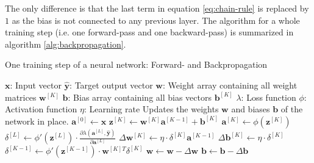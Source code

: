 The only difference is that the last term in equation \ref{eq:chain-rule} is replaced by $1$ as the bias is not connected to any previous layer.
The algorithm for a whole training step (i.e. one forward-pass and one backward-pass) is summarized in algorithm \ref{alg:backpropagation}.
\begin{algorithm}
    \caption{One training step of a neural network: Forward- and Backpropagation}
    \label{alg:backpropagation}
    \begin{algorithmic}[1]
        \renewcommand{\algorithmicensure}{\textbf{Output:}}
        \Require
            \Statex $\bm{x}$: Input vector
            \Statex $\bm{\hat{y}}$: Target output vector
            \Statex $\bm{w}$: Weight array containing all weight matrices $\bm{w}^{[K]}$
            \Statex $\bm{b}$: Bias array containing all bias vectors $\bm{b}^{[K]}$
            \Statex $\lambda$: Loss function
            \Statex $\phi$: Activation function
            \Statex $\eta$: Learning rate
        \Ensure Updates the weights $\bm{w}$ and biases $\bm{b}$ of the network in place.
        \Statex
        \State $\bm{a}^{[0]} \gets \bm{x}$ 
         
            \State $\bm{z}^{[K]} \gets \bm{w}^{[K]} \bm{a}^{[K-1]} + \bm{b}^{[K]}$ 
            \State $\bm{a}^{[K]} \gets \phi(\bm{z}^{[K]})$ 
        \EndFor
        \State $\delta^{[L]} \gets \phi'(\bm{z}^{[L]}) \cdot \frac{\partial \lambda(\bm{a}^{[L]}, \bm{\hat{y}})}{\partial \bm{a}^{[L]}}$ 
         
            \State $\Delta \bm{w}^{[K]} \gets \eta \cdot \delta^{[K]} \bm{a}^{[K-1]}$ 
            \State $\Delta \bm{b}^{[K]} \gets \eta \cdot \delta^{[K]}$ 
            \State $\delta^{[K-1]} \gets \phi'(\bm{z}^{[K-1]}) \cdot \bm{w}^{[K]T} \delta^{[K]}$ 
        \EndFor
        \State $\bm{w} \gets \bm{w} - \Delta \bm{w}$ 
        \State $\bm{b} \gets \bm{b} - \Delta \bm{b}$ 
    \end{algorithmic}
\end{algorithm}

